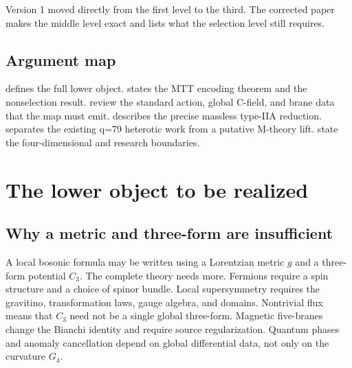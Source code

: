 \documentclass[11pt]{article}
\theoremstyle{definition}
\theoremstyle{remark}
\begin{document}
Version 1 moved directly from the first level to the third.  The corrected
paper makes the middle level exact and lists what the selection level still
requires.

\subsection{Argument map}

 defines the full lower object.
 states the MTT encoding theorem and the nonselection result.
 review the standard action, global
C-field, and brane data that the map must emit.
 describes the precise massless type-IIA reduction.
 separates the existing q=79 heterotic work from a putative
M-theory lift.
 state the four-dimensional and research
boundaries.

\section{The lower object to be realized}
\label{sec:record}

\subsection{Why a metric and three-form are insufficient}

A local bosonic formula may be written using a Lorentzian metric \(g\) and a
three-form potential \(C_3\).  The complete theory needs more.  Fermions
require a spin structure and a choice of spinor bundle.  Local
supersymmetry requires the gravitino, transformation laws, gauge algebra, and
domains.  Nontrivial flux means that \(C_3\) need not be a single global
three-form.  Magnetic five-branes change the Bianchi identity and require
source regularization.  Quantum phases and anomaly cancellation depend on
global differential data, not only on the curvature \(G_4\).
\end{document}
